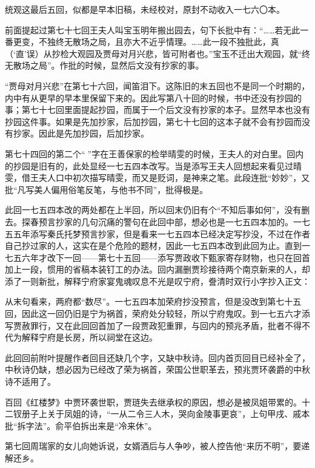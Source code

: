 \par 统观这最后五回，似都是早本旧稿，未经校对，原封不动收入一七六〇本。
\par 前面提起过第七十七回王夫人叫宝玉明年搬出园去，句下长批中有：“……若无此一番更变，不独终无散场之局，且亦大不近乎情理。……此一段不独批此，真（‘直’误）从抄检大观园及贾母对月兴悲，皆可附者也。”宝玉不迁出大观园，就“终无散场之局”。作批的时候，显然后文没有抄家的事。
\par “贾母对月兴悲”在第七十六回，闻笛泪下。这陈旧的末五回也不是同一个时期的，内中有从更早的早本里保留下来的。因此写第八十回的时候，书中还没有抄园的事；第七十七回里面提起抄园，而属于一个后文没有抄家的本子。显然早本也没有抄园这件事。如果是先加抄家，后加抄园，第七十七回的这本子就不会有抄园而没有抄家。因此是先加抄园，后加抄家。
\par 第七十四回的第二个“𤞘”字在王善保家的检举晴雯的时候，王夫人的对白里。回内的抄园是旧有的，此处显经一七五四本改写。当是添写王夫人回想起来看见过晴雯，借王夫人口中初次描写晴雯，而又是贬词，是神来之笔。此段连批“妙妙”，又批“凡写美人偏用俗笔反笔，与他书不同”，批得极是。
\par 此回一七五四本改的两处都在上半回，所以回末仍旧有个“不知后事如何”，没有删去。探春预言抄家的几句沉痛的警句在此回中部，想必也是一七五四本加的。一七五五年添写秦氏托梦预言抄家，但是看来一七五四本已经决定写抄没，不过在作者自己抄过家的人，这实在是个危险的题材，因此一七五四本改到此回为止。直到一七五六年才改下一回——第七十五回——添写贾政收下甄家寄存财物，也只在回首加上一段，惯用的省稿本装钉工的办法。回内漏删贾珍接待两个南京新来的人，却添了一则新批，解释宁府家宴鬼魂叹息不光是叹宁府，誊清时双行小字抄入正文：
\par 从末句看来，两府都“数尽”。一七五四本加荣府抄没预言，但是没改到第七十五回，因此这一回仍旧是宁为祸首，荣府处分较轻，所以宁府鬼叹。到一七五六才添写贾赦罪行，又在此回回首加了一段贾政犯重罪，与回内的预兆矛盾，批者不得不代为解释宁府是长房，所以祠堂在这边。
\par 此回回前附叶提醒作者回目还缺几个字，又缺中秋诗。回内首页回目已经补全了，中秋诗仍缺，想必因为已经改了荣为祸首，荣国公世职革去，预兆贾环袭爵的中秋诗不适用了。
\par 百回《红楼梦》中贾环袭世职，贾琏失去继承权的原因，想必是被凤姐带累的。十二钗册子上关于凤姐的诗，“一从二令三人木，哭向金陵事更哀”，上句甲戌、戚本批“拆字法”。俞平伯拆出来是“冷来休”。
\par 第七回周瑞家的女儿向她诉说，女婿酒后与人争吵，被人控告他“来历不明”，要递解还乡。

